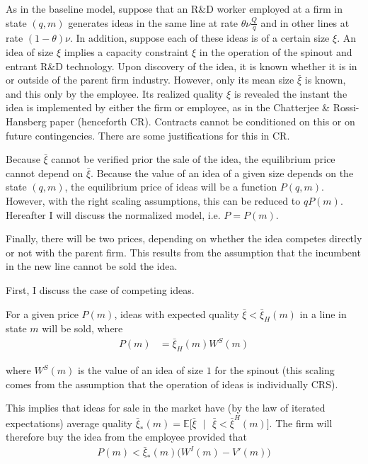 \documentclass[12pt,english]{article}
\theoremstyle{remark}
\begin{document}
As in the baseline model, suppose that an R\&D worker employed at a firm in state $(q,m)$ generates ideas in the same line at rate $\theta \nu \frac{Q}{q}$ and in other lines at rate $(1-\theta) \nu$. In addition, suppose each of these ideas is of a certain size $\xi$. An idea of size $\xi$ implies a capacity constraint $\xi$ in the operation of the spinout and entrant R\&D technology. Upon discovery of the idea, it is known whether it is in or outside of the parent firm industry. However, only its mean size $\bar{\xi}$ is known, and this only by the employee. Its realized quality $\xi$ is revealed the instant the idea is implemented by either the firm or employee, as in the Chatterjee \& Rossi-Hansberg paper (henceforth CR). Contracts cannot be conditioned on this or on future contingencies. There are some justifications for this in CR.

Because $\bar{\xi}$ cannot be verified prior the sale of the idea, the equilibrium price cannot depend on $\bar{\xi}$. Because the value of an idea of a given size depends on the state $(q,m)$, the equilibrium price of ideas will be a function $P(q,m)$. However, with the right scaling assumptions, this can be reduced to $qP(m)$. Hereafter I will discuss the normalized model, i.e. $P = P(m)$. 

Finally, there will be two prices, depending on whether the idea competes directly or not with the parent firm. This results from the assumption that the incumbent in the new line cannot be sold the idea.

First, I discuss the case of competing ideas.

For a given price $P(m)$, ideas with expected quality $\bar{\xi} < \bar{\xi}_H(m)$ in a line in state $m$ will be sold, where
\begin{align}
	P(m) &= \bar{\xi}_H(m) W^S(m)
\end{align} 

where $W^S(m)$ is the value of an idea of size $1$ for the spinout (this scaling comes from the assumption that the operation of ideas is individually CRS).

This implies that ideas for sale in the market have (by the law of iterated expectations) average quality $\bar{\xi}_*(m) = \mathbb{E}\Big[ \bar{\xi} \textrm{ } \Big| \textrm{ }  \bar{\xi} < \bar{\xi}^H(m) \Big]$. The firm will therefore buy the idea from the employee provided that
\begin{align}
	P(m) < \bar{\xi}_*(m) \Big( W^I(m) - V'(m) \Big)
\end{align}
\end{document}

